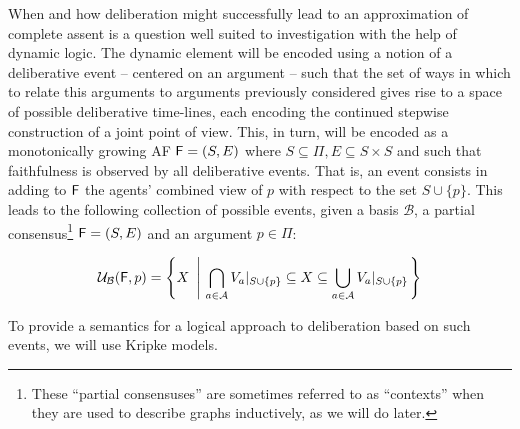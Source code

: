 \documentclass{llncs}
\newcommand{\update}[3]{{\mathcal U}_{#1}(#2,#3)}
\newcommand{\af}{{\sf F}}
\newcommand{\views}{\mathcal B}
\begin{document}
When and how deliberation might successfully lead to an approximation of complete assent is a question well suited to investigation with the help of dynamic logic. The dynamic element will be encoded using a notion of a deliberative event -- centered on an argument -- such that the set of ways in which to relate this arguments to arguments previously considered gives rise to a space of possible deliberative time-lines, each encoding the continued stepwise construction of a joint point of view. This, in turn, will be encoded as a monotonically growing AF $\af = (S,E)$ where $S \subseteq \Pi, E \subseteq S \times S$ and such that faithfulness is observed by all deliberative events. That is, an event consists in adding to $\af$ the agents' combined view of $p$ with respect to the set $S \cup \{p\}$. This leads to the following collection of possible events, given a basis $\views$, a partial consensus\footnote{These ``partial consensuses'' are sometimes referred to as ``contexts'' when they are used to describe graphs inductively, as we will do later.} $\af = (S,E)$ and an argument $p \in \Pi$:

\begin{equation}\label{eq:update}
\update \views \af p = \left\{X ~\left|~ \bigcap_{a \in \agents}\restr {V_a} {S \cup \{p\}} \subseteq X \subseteq \bigcup_{a \in \agents}\restr {V_a}{S \cup \{p\}}\right.\right\}
\end{equation}

To provide a semantics for a logical approach to deliberation based on such events, we will use Kripke models.
\end{document}
